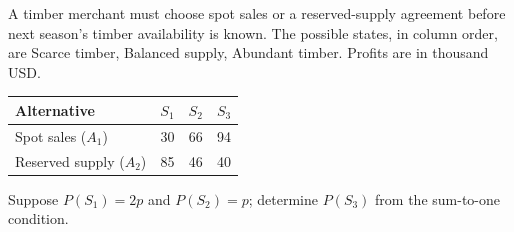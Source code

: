 \clearpage
{}
A timber merchant must choose spot sales or a reserved-supply agreement before next season's timber availability is known. The possible states, in column order, are Scarce timber, Balanced supply, Abundant timber. Profits are in thousand USD.
\begin{center}
\begin{tabular}{@{}lccc@{}}\toprule
Alternative & $S_1$ & $S_2$ & $S_3$\\\midrule
Spot sales ($A_1$) & 30 & 66 & 94\\
Reserved supply ($A_2$) & 85 & 46 & 40\\
\bottomrule\end{tabular}
\end{center}
Suppose $P(S_1)=2p$ and $P(S_2)=p$; determine $P(S_3)$ from the sum-to-one condition.
